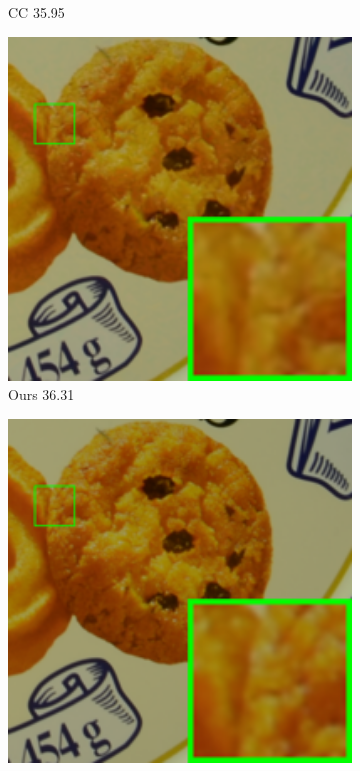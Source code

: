 \begin{figure}
\begin{subfigure}[t]{0.19\textwidth}
\caption{CC 35.95}
    \end{subfigure}
    \hfill
    \begin{subfigure}[t]{0.19\textwidth}
        \centering
        \includegraphics[width=1\textwidth]{images/guided/cc15/resize_br_Guided_d600_iso3200_2_real.png}
\caption{Ours 36.31}
    \end{subfigure}
    \hfill
    \begin{subfigure}[t]{0.19\textwidth}
        \centering
        \includegraphics[width=1\textwidth]{images/guided/cc15/resize_br_Mean_d600_iso3200_2_real.png}

\end{subfigure}
\end{figure}
